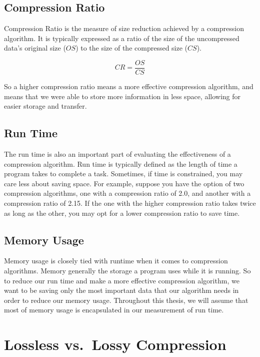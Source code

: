 \documentclass[12pt,twoside]{reedthesis}
\begin{document}
\hypertarget{compression-ratio}{%
\subsection{Compression Ratio}\label{compression-ratio}}

Compression Ratio is the measure of size reduction achieved by a compression algorithm. It is typically expressed as a ratio of the size of the uncompressed data's original size (\(OS\)) to the size of the compressed size (\(CS\)).

\[CR = \frac{OS}{CS}\]

So a higher compression ratio means a more effective compression algorithm, and means that we were able to store more information in less space, allowing for easier storage and transfer.

\hypertarget{run-time}{%
\subsection{Run Time}\label{run-time}}

The run time is also an important part of evaluating the effectiveness of a compression algorithm. Run time is typically defined as the length of time a program takes to complete a task. Sometimes, if time is constrained, you may care less about saving space. For example, suppose you have the option of two compression algorithms, one with a compression ratio of 2.0, and another with a compression ratio of 2.15. If the one with the higher compression ratio takes twice as long as the other, you may opt for a lower compression ratio to save time.

\hypertarget{memory-usage}{%
\subsection{Memory Usage}\label{memory-usage}}

Memory usage is closely tied with runtime when it comes to compression algorithms. Memory generally the storage a program uses while it is running. So to reduce our run time and make a more effective compression algorithm, we want to be saving only the most important data that our algorithm needs in order to reduce our memory usage. Throughout this thesis, we will assume that most of memory usage is encapsulated in our measurement of run time.

\hypertarget{lossless-vs.-lossy-compression}{%
\section{Lossless vs.~Lossy Compression}\label{lossless-vs.-lossy-compression}}
\end{document}
